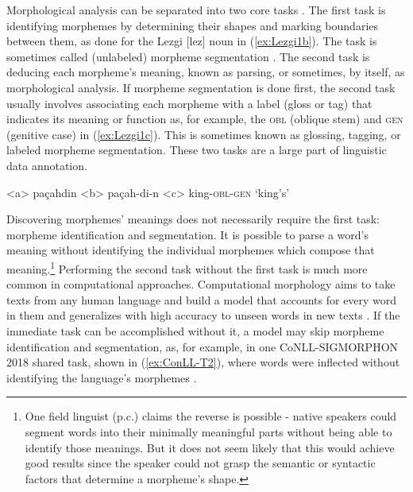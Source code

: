 \documentclass[12pt]{article}
\begin{document}
Morphological analysis can be separated into two core tasks \cite{cotterell_labeled_2015,hammarstrom_unsupervised_2011,nicolai_morphological_2017,palmer_semi-automated_2009}. The first task is identifying morphemes by determining their shapes and marking boundaries between them, as done for the Lezgi [lez] noun in (\ref{ex:Lezgi1b}). The task is sometimes called (unlabeled) morpheme segmentation \cite{creutz_unsupervised_2007,snyder_unsupervised_2008}. The second task is deducing each morpheme's meaning, known as parsing, or sometimes, by itself, as morphological analysis. If morpheme segmentation is done first, the second task usually involves associating each morpheme with a label (gloss or tag) that indicates its meaning or function as, for example, the \textsc{obl} (oblique stem) and \textsc{gen} (genitive case) in (\ref{ex:Lezgi1c}). This is sometimes known as glossing, tagging, or labeled morpheme segmentation. These two tasks are a large part of linguistic data annotation. 

\begin{singlespace}


\label{ex:Lezgi1}
\a<a> pa\c{c}ahdin 
\label{ex:Lezgi1a}
\a<b> pa\c{c}ah-di-n 
\label{ex:Lezgi1b}
\a<c> king-\textsc{obl}-\textsc{gen} 
\label{ex:Lezgi1c}
\a `king's'
\label{ex:Lezgi1d}
\xe

\end{singlespace}

Discovering morphemes' meanings does not necessarily require the first task: morpheme identification and segmentation. It is possible to parse a word's meaning without identifying the individual morphemes which compose that meaning.\footnote{One field linguist (p.c.) claims the reverse is possible - native speakers could segment words into their minimally meaningful parts without being able to identify those meanings.  But it does not seem likely that this would achieve good results since the speaker could not grasp the semantic or syntactic factors that determine a morpheme’s shape.} Performing the second task without the first task is much more common in computational approaches. Computational morphology aims to take texts from any human language and build a model that accounts for every word in them and generalizes with high accuracy to unseen words in new texts \cite{goldsmith_computational_2017}. If the immediate task can be accomplished without it, a model may skip morpheme identification and segmentation, as, for example, in one CoNLL-SIGMORPHON 2018 shared task, shown in (\ref{ex:ConLL-T2}), where words were inflected without identifying the language's morphemes \cite{cotterell_conllsigmorphon_2018}.
\end{document}
